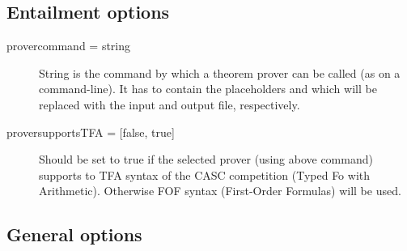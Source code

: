 \subsection{Entailment options}
\begin{description}
	\item[{provercommand = string}] String is the command by which a theorem prover can be called (as on a command-line). It has to contain the placeholders  and  which will be replaced with the input and output file, respectively.
	\item[{proversupportsTFA = [false, true]}] Should be set to true if the selected prover (using above command) supports to TFA syntax of the CASC competition (Typed Fo with Arithmetic). Otherwise FOF syntax (First-Order Formulas) will be used.
\end{description}

\subsection{General options}

